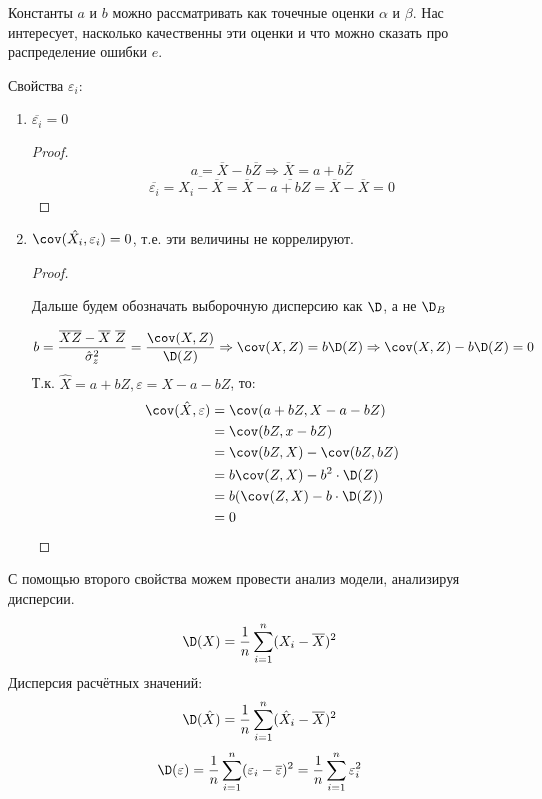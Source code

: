 Константы \(a\) и \(b\) можно рассматривать как точечные оценки \(\alpha\) и \(\beta\). Нас интересует, насколько качественны эти оценки и что можно сказать про распределение ошибки \(e\).

Свойства \(\varepsilon_i\):
\begin{enumerate}
    \item \(\overline{\varepsilon_i} = 0\)
          \begin{proof}
              \[a = \overline{X} - b \overline{Z} \Rightarrow \overline{X} = a + b \overline{Z}\]
              \[\overline{\varepsilon_i} = \overline{X_i - \overline{X}} = \overline{X} - \overline{a + bZ} = \overline{X} - \overline{X} = 0\]
          \end{proof}
    \item \(\cov (\hat{X_i}, \varepsilon_i) = 0\), т.е. эти величины не коррелируют.
          \begin{proof}
              \begin{remark}
                  Дальше будем обозначать выборочную дисперсию как \(\D\), а не \(\D_B\)
              \end{remark}
              \[b = \frac{ \overline{XZ} - \overline{X}\ \overline{Z}}{ \hat{\sigma}_z^2} = \frac{\cov(X, Z)}{\D(Z)} \Rightarrow \cov(X, Z) = b \D(Z) \Rightarrow \cov(X, Z) - b \D(Z) = 0\]
              Т.к. \(\hat{X} = a + b Z, \varepsilon = X - a - bZ\), то:
              \begin{align*}
                  \cov(\hat{X}, \varepsilon) & = \cov(a + bZ, X - a - bZ)       \\
                                             & = \cov(bZ, x - bZ)               \\
                                             & = \cov(bZ, X) - \cov(bZ, bZ)     \\
                                             & = b \cov(Z, X) - b^2 \cdot \D(Z) \\
                                             & = b (\cov(Z, X) - b\cdot \D(Z))  \\
                                             & = 0                              \\
              \end{align*}
          \end{proof}
\end{enumerate}

С помощью второго свойства можем провести анализ модели, анализируя дисперсии.
\begin{obozn}
    \[\D(X) = \frac{1}{n} \sum_{i=1}^{n} (X_i - \overline{X})^2\]
    Дисперсия расчётных значений:
    \[\D (\hat{X}) = \frac{1}{n} \sum_{i=1}^{n} ( \hat{X}_i - \overline{X})^2\]
    \[\D(\varepsilon) = \frac{1}{n} \sum_{i=1}^{n} (\varepsilon_i - \overline{\varepsilon})^2 = \frac{1}{n} \sum_{i=1}^{n} \varepsilon_i^2\]
\end{obozn}


